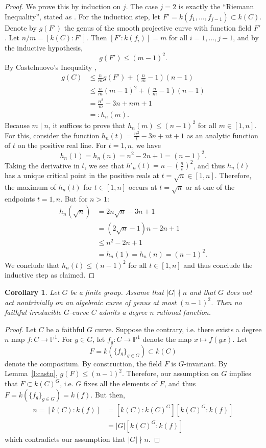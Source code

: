 \documentclass[11pt]{amsart}
\newtheorem{corollary}[theorem]{Corollary}
\theoremstyle{definition}
\numberwithin{equation}{section}
\newcommand{\Pb}{\mathbb{P}}
\begin{document}
\begin{proof}
	We prove this by induction on $j$.  The case $j=2$ is exactly the ``Riemann Inequality'', stated as \cite[Corollary 3.11.4]{Stichtenoth}. For the induction step, let $F'=k(f_1,\ldots,f_{j-1})\subset k(C)$.  Denote by $g(F')$ the genus of the smooth projective curve with function field $F'$. Let $n/m=[k(C):F']$.  Then $[F':k(f_i)]=m$ for all $i=1,\ldots,j-1$, and by the inductive hypothesis, 
	\[
		g(F')\le (m-1)^2.
	\]
	By Castelnuovo's Inequality \cite[Theorem 3.11.3]{Stichtenoth}, 
	\begin{align*}
		g(C)&\le \frac{n}{m}g(F')+(\frac{n}{m}-1)(n-1)\\
		&\le \frac{n}{m}(m-1)^2+(\frac{n}{m}-1)(n-1)\\
		&=\frac{n^2}{m} -3n+nm+1\\
		&=:h_n(m).
	\end{align*}
	Because $m\mid n$, it suffices to prove that $h_n(m)\leq (n-1)^2$ for all $m\in [1,n]$.  For this, consider the function $h_n(t)=\frac{n^2}{t}-3n+nt+1$ as an analytic function of $t$ on the positive real line. For $t=1,n$, we have
	\[
		h_n(1)=h_n(n)=n^2-2n+1=(n-1)^2.
	\]
	Taking the derivative in $t$, we see that $h'_n(t)=n-\left(\frac{n}{t}\right)^2$, and thus $h_n(t)$ has a unique critical point in the positive reals at $t=\sqrt{n}\in [1,n]$.  Therefore, the maximum of $h_n(t)$ for $t\in [1,n]$ 
	occurs at $t=\sqrt{n}$ or at one of the endpoints $t=1,n$.  But for 
	$n>1$: 
	\begin{align*}
		h_n(\sqrt{n})&=2n\sqrt{n}-3n+1\\
		&=(2\sqrt{n}-1)n-2n+1\\
		&\le n^2-2n+1\\
		&=h_n(1)=h_n(n)=(n-1)^2. 
	\end{align*}
	We conclude that $h_n(t)\le (n-1)^2$ for all $t\in [1,n]$ and thus conclude the inductive step as claimed. 
\end{proof}

\begin{corollary}\label{c:key}
	Let $G$ be a finite group. Assume that $|G|\nmid n$ and that $G$ does not act nontrivially on an algebraic curve of genus at most $(n-1)^2$. Then no faithful irreducible $G$-curve $C$ admits a degree $n$ rational function. 
\end{corollary}
\begin{proof}
	Let $C$ be a faithful $G$ curve. Suppose the contrary, i.e. there exists a degree $n$ map $f\colon C\to \Pb^1$. For $g\in G$, let $f_g\colon C\to\Pb^1$ denote the map $x\mapsto f(gx)$.  Let 
	\[
		F=k(\{f_g\}_{g\in G})\subset k(C)
	\]
	denote the compositum. By construction, the field $F$ is $G$-invariant.  By Lemma~\ref{l:castn}, $g(F)\le (n-1)^2$.  Therefore, our assumption on $G$ implies that $F\subset k(C)^G$, i.e. $G$ fixes all the elements of $F$, and thus $F=k\left(\{f_g\}_{g\in G}\right)=k(f)$. But then,
	\begin{align*}
		n=[k(C):k(f)]&=[k(C):k(C)^G][k(C)^G:k(f)]\\
			&=|G|[k(C)^G:k(f)]
	\end{align*}
	which contradicts our assumption that $|G|\nmid n$.
\end{proof}
\end{document}
